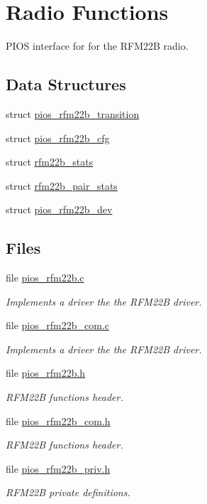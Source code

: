\hypertarget{group___p_i_o_s___r_f_m22_b}{\section{\-Radio \-Functions}
\label{group___p_i_o_s___r_f_m22_b}
}


\-P\-I\-O\-S interface for for the \-R\-F\-M22\-B radio.  


\subsection*{\-Data \-Structures}
\begin{DoxyCompactItemize}
\item 
struct \hyperlink{structpios__rfm22b__transition}{pios\-\_\-rfm22b\-\_\-transition}
\item 
struct \hyperlink{structpios__rfm22b__cfg}{pios\-\_\-rfm22b\-\_\-cfg}
\item 
struct \hyperlink{structrfm22b__stats}{rfm22b\-\_\-stats}
\item 
struct \hyperlink{structrfm22b__pair__stats}{rfm22b\-\_\-pair\-\_\-stats}
\item 
struct \hyperlink{structpios__rfm22b__dev}{pios\-\_\-rfm22b\-\_\-dev}
\end{DoxyCompactItemize}
\subsection*{\-Files}
\begin{DoxyCompactItemize}
\item 
file \hyperlink{pios__rfm22b_8c}{pios\-\_\-rfm22b.\-c}
\begin{DoxyCompactList}\small\item\em \-Implements a driver the the \-R\-F\-M22\-B driver. \end{DoxyCompactList}\item 
file \hyperlink{pios__rfm22b__com_8c}{pios\-\_\-rfm22b\-\_\-com.\-c}
\begin{DoxyCompactList}\small\item\em \-Implements a driver the the \-R\-F\-M22\-B driver. \end{DoxyCompactList}\item 
file \hyperlink{pios__rfm22b_8h}{pios\-\_\-rfm22b.\-h}
\begin{DoxyCompactList}\small\item\em \-R\-F\-M22\-B functions header. \end{DoxyCompactList}\item 
file \hyperlink{pios__rfm22b__com_8h}{pios\-\_\-rfm22b\-\_\-com.\-h}
\begin{DoxyCompactList}\small\item\em \-R\-F\-M22\-B functions header. \end{DoxyCompactList}\item 
file \hyperlink{pios__rfm22b__priv_8h}{pios\-\_\-rfm22b\-\_\-priv.\-h}
\begin{DoxyCompactList}\small\item\em \-R\-F\-M22\-B private definitions. \end{DoxyCompactList}\end{DoxyCompactItemize}
